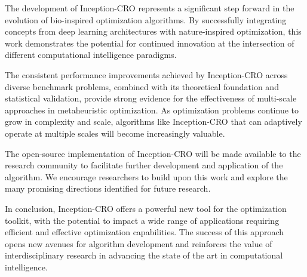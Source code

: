 The development of Inception-CRO represents a significant step forward in the evolution of bio-inspired optimization algorithms. By successfully integrating concepts from deep learning architectures with nature-inspired optimization, this work demonstrates the potential for continued innovation at the intersection of different computational intelligence paradigms.

The consistent performance improvements achieved by Inception-CRO across diverse benchmark problems, combined with its theoretical foundation and statistical validation, provide strong evidence for the effectiveness of multi-scale approaches in metaheuristic optimization. As optimization problems continue to grow in complexity and scale, algorithms like Inception-CRO that can adaptively operate at multiple scales will become increasingly valuable.

The open-source implementation of Inception-CRO will be made available to the research community to facilitate further development and application of the algorithm. We encourage researchers to build upon this work and explore the many promising directions identified for future research.

In conclusion, Inception-CRO offers a powerful new tool for the optimization toolkit, with the potential to impact a wide range of applications requiring efficient and effective optimization capabilities. The success of this approach opens new avenues for algorithm development and reinforces the value of interdisciplinary research in advancing the state of the art in computational intelligence.
